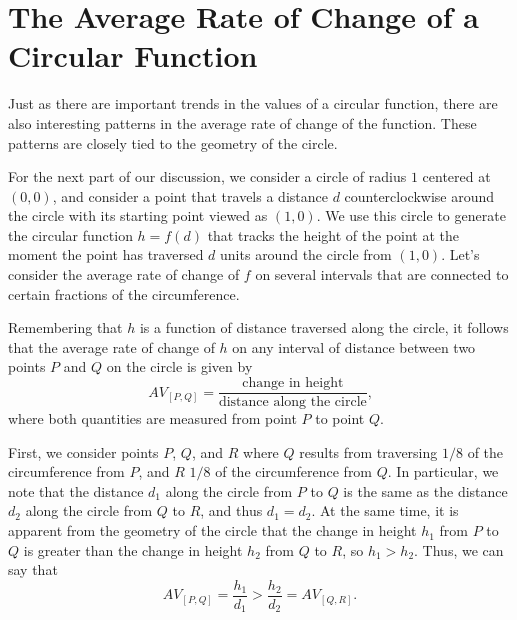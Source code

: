 \documentclass[nooutcomes, noauthor]{ximera}
\begin{document}


\section{The Average Rate of Change of a Circular Function}

Just as there are important trends in the values of a circular function, there are also interesting patterns in the average rate of change of the function.  These patterns are closely tied to the geometry of the circle.%

For the next part of our discussion, we consider a circle of radius \(1\) centered at \((0,0)\), and consider a point that travels a distance \(d\) counterclockwise around the circle with its starting point viewed as \((1,0)\).  We use this circle to generate the circular function \(h = f(d)\) that tracks the height of the point at the moment the point has traversed \(d\) units around the circle from \((1,0)\).  Let's consider the average rate of change of \(f\) on several intervals that are connected to certain fractions of the circumference.%

Remembering that \(h\) is a function of distance traversed along the circle, it follows that the average rate of change of \(h\) on any interval of distance between two points \(P\) and \(Q\) on the circle is given by%
\begin{equation*}
AV_{[P,Q]} = \frac{\text{change in height}}{\text{distance along the circle}}\text{,}
\end{equation*}
where both quantities are measured from point \(P\) to point \(Q\).%


First, we consider points \(P\), \(Q\), and \(R\) where \(Q\) results from traversing \(1/8\) of the circumference from \(P\), and \(R\) \(1/8\) of the circumference from \(Q\).  In particular, we note that the distance \(d_1\) along the circle from \(P\) to \(Q\) is the same as the distance \(d_2\) along the circle from \(Q\) to \(R\), and thus \(d_1 = d_2\).  At the same time, it is apparent from the geometry of the circle that the change in height \(h_1\) from \(P\) to \(Q\) is greater than the change in height \(h_2\) from \(Q\) to \(R\), so \(h_1 \gt h_2\).  Thus, we can say that%
\begin{equation*}
AV_{[P,Q]} = \frac{h_1}{d_1} \gt \frac{h_2}{d_2} = AV_{[Q,R]} \text{.}
\end{equation*}
\end{document}

